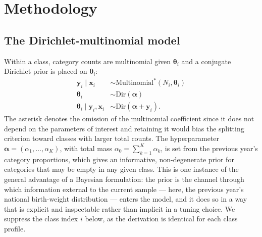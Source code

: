 \documentclass[AMA]{USG}
\begin{document}
\section{Methodology}
\label{sec:methods}

\subsection{The Dirichlet-multinomial model}
Within a class, category counts are multinomial given \(\boldsymbol{\theta}_i\) and a conjugate Dirichlet prior is placed on \(\boldsymbol{\theta}_i\):
\begin{align*}
\mathbf{y}_i \mid \mathbf{x}_i
   &\sim \text{Multinomial}^{\ast}(N_i,\boldsymbol{\theta}_i)\\
\boldsymbol{\theta}_i &\sim \mathrm{Dir}(\boldsymbol{\alpha})\\
\boldsymbol{\theta}_i \mid \mathbf{y}_i,\mathbf{x}_i
   &\sim \mathrm{Dir}(\boldsymbol{\alpha}+\mathbf{y}_i).
\end{align*}
The asterisk denotes the omission of the multinomial coefficient since it does not depend on the parameters of interest and retaining it would bias the splitting criterion toward classes with larger total counts. The hyperparameter \(\boldsymbol{\alpha} = (\alpha_1, \dots, \alpha_K)\), with total mass \(\alpha_0 = \sum_{k=1}^{K} \alpha_k\), is set from the previous year's category proportions, which gives an informative, non-degenerate prior for categories that may be empty in any given class. This is one instance of the general advantage of a Bayesian formulation: the prior is the channel through which information external to the current sample --- here, the previous year's national birth-weight distribution --- enters the model, and it does so in a way that is explicit and inspectable rather than implicit in a tuning choice. We suppress the class index \(i\) below, as the derivation is identical for each class profile.
\end{document}
